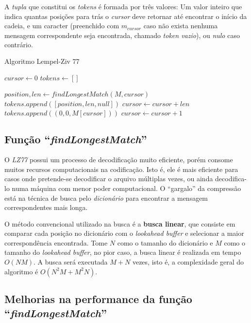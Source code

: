A \emph{tupla} que constitui os \emph{tokens} é formada por três valores:
Um valor inteiro que indica quantas posições para trás o \emph{cursor} deve retornar até encontrar o início da cadeia, e um caracter
(preenchido com $m_{cursor}$ caso não exista nenhuma mensagem correspondente seja encontrada, chamado \emph{token vazio}), ou \emph{nulo} caso contrário.

\begin{algorithm}[H]
\caption{Algoritmo Lempel-Ziv 77} \label{alg:lz77}
\begin{algorithmic}

	\State $cursor \gets 0$
	\State $tokens \gets []$

		\State $position, len \gets findLongestMatch(M, cursor)$ 
		 
			\State $tokens.append([position, len, null])$
			\State $cursor \gets cursor + len$
		\Else
			\State $tokens.append((0, 0, M[cursor]))$ 
			\State $cursor \gets cursor + 1$
		\EndIf
	\EndWhile
\end{algorithmic}
\end{algorithm}

\subsection{Função ``\emph{findLongestMatch}'' }
O \emph{LZ77} possui um processo de decodificação muito eficiente, porém consome muitos recursos computacionais na codificação. 
Isto é, ele é mais eficiente para casos onde pretende-se decodificar o arquivo múltiplas vezes, ou ainda decodifica-lo numa máquina com menor poder computacional. 
O ``gargalo'' da compressão está na técnica de busca pelo \emph{dicionário} para encontrar a mensagem correspondentes mais longa.

O método convencional utilizado na busca é a \textbf{busca linear}, que consiste em comparar cada posição no dicionário com o \emph{lookahead buffer} e selecionar a maior correspondência encontrada. 
Tome $N$ como o tamanho do dicionário e $M$ como o tamanho do \emph{lookahead buffer}, no pior caso, a busca linear é realizada em tempo $O(NM)$. 
A busca será executada $M + N$ vezes, isto é, a complexidade geral do algoritmo é $O( N^{2}M + M^{2}N)$.

\subsection{Melhorias na performance da função ``\emph{findLongestMatch}'' }


